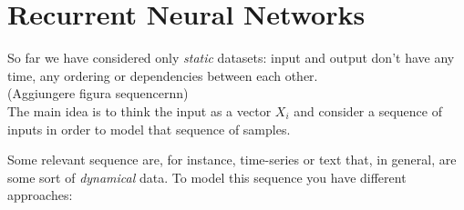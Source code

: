 \section{Recurrent Neural Networks}
So far we have considered only \textit{static} datasets: input and output don't have any time, any ordering or dependencies between each other.\\
(Aggiungere figura sequencernn)\\
The main idea is to think the input as a vector $X_i$ and consider a sequence of inputs in order to model that sequence of samples. 

Some relevant sequence are, for instance, time-series or text that, in general, are some sort of \textit{dynamical} data. To model this sequence you have different approaches: 


